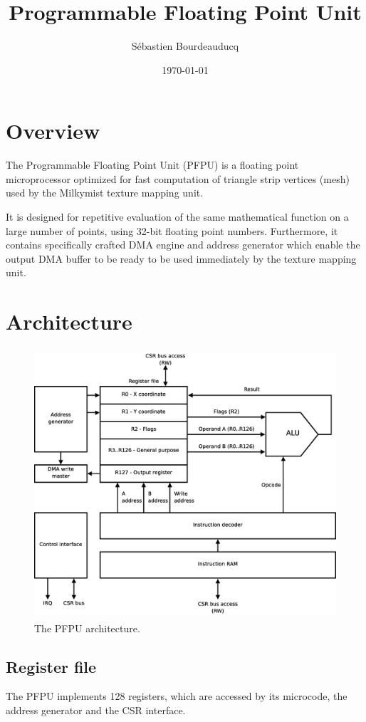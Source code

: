 \documentclass[a4paper,11pt]{article}
\title{Programmable Floating Point Unit}
\author{S\'ebastien Bourdeauducq}
\date{\today}
\begin{document}
\setlength{\parindent}{0pt}
\setlength{\parskip}{5pt}
\maketitle{}
\section{Overview}
The Programmable Floating Point Unit (PFPU) is a floating point microprocessor optimized for fast computation of triangle strip vertices (mesh) used by the Milkymist texture mapping unit.

It is designed for repetitive evaluation of the same mathematical function on a large number of points, using 32-bit floating point numbers. Furthermore, it contains specifically crafted DMA engine and address generator which enable the output DMA buffer to be ready to be used immediately by the texture mapping unit.

\section{Architecture}

\begin{figure}[H]
\centering
\includegraphics[height=100mm]{architecture.eps}
\caption{The PFPU architecture.}\label{fig:architecture}
\end{figure}

\subsection{Register file}
The PFPU implements 128 registers, which are accessed by its microcode, the address generator and the CSR interface.\\
\end{document}
